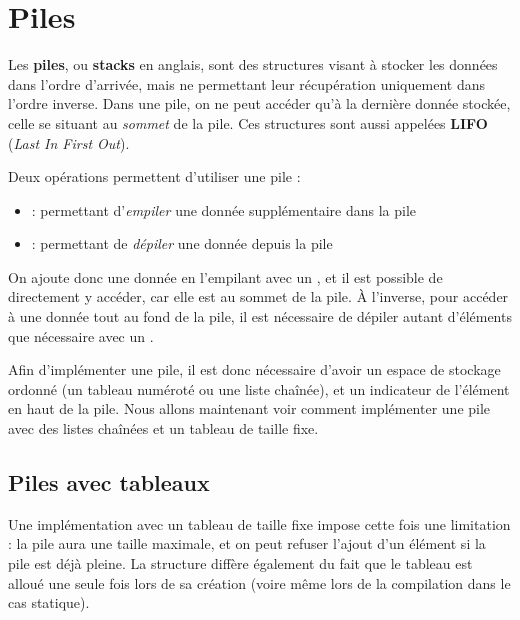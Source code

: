 \documentclass[11pt,a4paper]{article}
\begin{document}
\newpage


\section{Piles}

\bigskip

Les \textbf{piles}, ou \textbf{stacks} en anglais, sont des structures visant à stocker les données dans l'ordre d'arrivée, mais ne permettant leur récupération uniquement dans l'ordre inverse.
Dans une pile, on ne peut accéder qu'à la dernière donnée stockée, celle se situant au \textit{sommet} de la pile.
Ces structures sont aussi appelées \textbf{LIFO} (\textit{Last In First Out}).\\

\medskip

Deux opérations permettent d'utiliser une pile :
\begin{itemize}
\item {} : permettant d'\textit{empiler} une donnée supplémentaire dans la pile
\item {} : permettant de \textit{dépiler} une donnée depuis la pile
\end{itemize}
On ajoute donc une donnée en l'empilant avec un , et il est possible de directement y accéder, car elle est au sommet de la pile.
À l'inverse, pour accéder à une donnée tout au fond de la pile, il est nécessaire de dépiler autant d'éléments que nécessaire avec un .\\

\medskip

Afin d'implémenter une pile, il est donc nécessaire d'avoir un espace de stockage ordonné (un tableau numéroté ou une liste chaînée), et un indicateur de l'élément en haut de la pile.
Nous allons maintenant voir comment implémenter une pile avec des listes chaînées et un tableau de taille fixe.

\bigskip


\subsection{Piles avec tableaux}

\bigskip

Une implémentation avec un tableau de taille fixe impose cette fois une limitation : la pile aura une taille maximale, et on peut refuser l'ajout d'un élément si la pile est déjà pleine.
La structure diffère également du fait que le tableau est alloué une seule fois lors de sa création (voire même lors de la compilation dans le cas statique).
\end{document}
